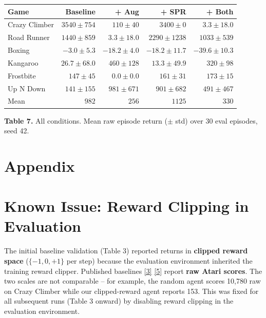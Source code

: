 \documentclass[11pt]{article}
\newcommand{\citelink}[2]{\href{#1}{\small[#2]}}
\begin{document}
\begin{table}[h]
\centering
\renewcommand{\arraystretch}{1.4}
\setlength{\tabcolsep}{14pt}
\begin{tabular}{l rrrr}
\toprule
\textbf{Game}
  & \textbf{Baseline}
  & \textbf{+ Aug}
  & \textbf{+ SPR}
  & \textbf{+ Both} \\
\midrule
Crazy Climber  & $3540 \pm 754$   & $110 \pm 40$      & $3400 \pm 0$      & $3.3 \pm 18.0$    \\
Road Runner    & $1440 \pm 859$   & $3.3 \pm 18.0$    & $2290 \pm 1238$   & $1033 \pm 539$    \\
Boxing         & $-3.0 \pm 5.3$   & $-18.2 \pm 4.0$   & $-18.2 \pm 11.7$  & $-39.6 \pm 10.3$  \\
Kangaroo       & $26.7 \pm 68.0$  & $460 \pm 128$     & $13.3 \pm 49.9$   & $320 \pm 98$      \\
Frostbite      & $147 \pm 45$     & $0.0 \pm 0.0$     & $161 \pm 31$      & $173 \pm 15$      \\
Up N Down      & $141 \pm 155$    & $981 \pm 671$     & $901 \pm 682$     & $491 \pm 467$     \\
\midrule
Mean           & $982$  & $256$  & $1125$  & $330$  \\
\bottomrule
\end{tabular}

\vspace{1.2em}
{\raggedright\small \textbf{Table 7.} All conditions. Mean raw episode
return ($\pm$ std) over 30 eval episodes, seed 42.\par}
\end{table}

\clearpage

\appendix
\section*{Appendix}

\section{Known Issue: Reward Clipping in Evaluation}
\label{app:clipping}

The initial baseline validation (Table 3) reported returns in
\textbf{clipped reward space} ($\{-1, 0, +1\}$ per step) because the
evaluation environment inherited the training reward clipper. Published
baselines
\citelink{https://arxiv.org/abs/2007.05929}{3}%
\citelink{https://arxiv.org/abs/2004.14990}{5}
report \textbf{raw Atari scores}. The two scales are not comparable --
for example, the random agent scores 10,780 raw on Crazy Climber while
our clipped-reward agent reports 153. This was fixed for all subsequent
runs (Table 3 onward) by disabling reward clipping in the evaluation
environment.
\end{document}
